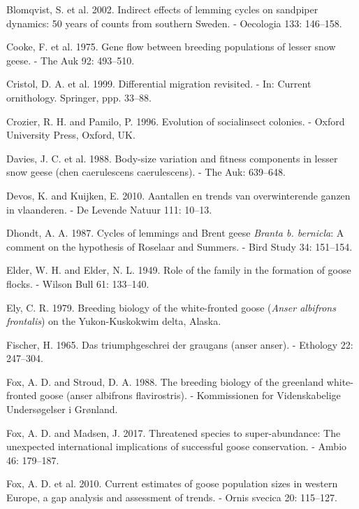 \documentclass[10pt,twocolumn]{paper}
\begin{document}
\hypertarget{ref-blomqvist2002indirect}{}
Blomqvist, S. et al. 2002. Indirect effects of lemming cycles on
sandpiper dynamics: 50 years of counts from southern Sweden. - Oecologia
133: 146--158.

\hypertarget{ref-cooke1975gene}{}
Cooke, F. et al. 1975. Gene flow between breeding populations of lesser
snow geese. - The Auk 92: 493--510.

\hypertarget{ref-cristol1999differential}{}
Cristol, D. A. et al. 1999. Differential migration revisited. - In:
Current ornithology. Springer, ppp. 33--88.

\hypertarget{ref-crozier1996evolution}{}
Crozier, R. H. and Pamilo, P. 1996. Evolution of socialinsect colonies.
- Oxford University Press, Oxford, UK.

\hypertarget{ref-davies1988body}{}
Davies, J. C. et al. 1988. Body-size variation and fitness components in
lesser snow geese (chen caerulescens caerulescens). - The Auk: 639--648.

\hypertarget{ref-devos2010aantallen}{}
Devos, K. and Kuijken, E. 2010. Aantallen en trends van overwinterende
ganzen in vlaanderen. - De Levende Natuur 111: 10--13.

\hypertarget{ref-dhondt1987cycles}{}
Dhondt, A. A. 1987. Cycles of lemmings and Brent geese \emph{Branta b.
bernicla}: A comment on the hypothesis of Roselaar and Summers. - Bird
Study 34: 151--154.

\hypertarget{ref-elder1949role}{}
Elder, W. H. and Elder, N. L. 1949. Role of the family in the formation
of goose flocks. - Wilson Bull 61: 133--140.

\hypertarget{ref-ely1979breeding}{}
Ely, C. R. 1979. Breeding biology of the white-fronted goose
(\emph{Anser albifrons frontalis}) on the Yukon-Kuskokwim delta, Alaska.

\hypertarget{ref-fischer1965triumphgeschrei}{}
Fischer, H. 1965. Das triumphgeschrei der graugans (anser anser). -
Ethology 22: 247--304.

\hypertarget{ref-fox1988breeding}{}
Fox, A. D. and Stroud, D. A. 1988. The breeding biology of the greenland
white-fronted goose (anser albifrons flavirostris). - Kommissionen for
Videnskabelige Undersøgelser i Grønland.

\hypertarget{ref-Fox2017a}{}
Fox, A. D. and Madsen, J. 2017. Threatened species to super-abundance:
The unexpected international implications of successful goose
conservation. - Ambio 46: 179--187.

\hypertarget{ref-fox2010current}{}
Fox, A. D. et al. 2010. Current estimates of goose population sizes in
western Europe, a gap analysis and assessment of trends. - Ornis svecica
20: 115--127.
\end{document}
